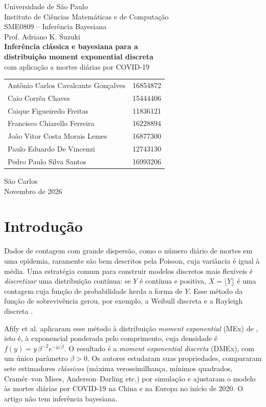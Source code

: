 \documentclass[11pt,a4paper]{article}
\begin{document}
\begin{titlepage}
\centering
{\large Universidade de São Paulo\\ Instituto de Ciências Matemáticas e de Computação}\\[1.5cm]
{\large SME0809 -- Inferência Bayesiana}\\
{\large Prof. Adriano K. Suzuki}\\[2.5cm]
{\LARGE\bfseries Inferência clássica e bayesiana para a\\[0.2cm] distribuição moment exponential discreta}\\[0.5cm]
{\large com aplicação a mortes diárias por COVID-19}\\[2.5cm]
\begin{tabular}{ll}
Antônio Carlos Cavalcante Gonçalves & 16854872\\
Caio Corrêa Chaves & 15444406\\
Caique Figueiredo Freitas & 11836121\\
Francisco Chiarello Ferreira & 16228894\\
João Vitor Costa Morais Lemes & 16877300\\
Paulo Eduardo De Vincenzi & 12743130\\
Pedro Paulo Silva Santos & 16993206
\end{tabular}
\vfill
São Carlos\\ Novembro de 2026
\end{titlepage}

\tableofcontents
\newpage

\section{Introdução}

Dados de contagem com grande dispersão, como o número diário de mortes em uma epidemia, raramente são bem descritos pela Poisson, cuja variância é igual à média. Uma estratégia comum para construir modelos discretos mais flexíveis é \emph{discretizar} uma distribuição contínua: se $Y$ é contínua e positiva, $X=\lfloor Y\rfloor$ é uma contagem cuja função de probabilidade herda a forma de $Y$. Esse método da função de sobrevivência gerou, por exemplo, a Weibull discreta \cite{nakagawa1975} e a Rayleigh discreta \cite{roy2004}.

Afify et al. \cite{afify2022} aplicaram esse método à distribuição \emph{moment exponential} (MEx) de \cite{dara2012}, isto é, à exponencial ponderada pelo comprimento, cuja densidade é $f(y)=y\,\beta^{-2}e^{-y/\beta}$. O resultado é a \emph{moment exponential discreta} (DMEx), com um único parâmetro $\beta>0$. Os autores estudaram suas propriedades, compararam sete estimadores \emph{clássicos} (máxima verossimilhança, mínimos quadrados, Cramér--von Mises, Anderson--Darling etc.) por simulação e ajustaram o modelo às mortes diárias por COVID-19 na China e na Europa no início de 2020. O artigo não tem inferência bayesiana.
\end{document}
